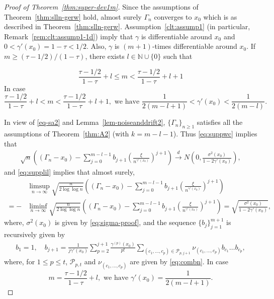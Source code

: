 \documentclass[12pt]{amsart}
\theoremstyle{plain}
\theoremstyle{remark}
\numberwithin{equation}{section}
\begin{document}
\begin{proof}[{Proof of Theorem~\ref{thm:super-dev1m}}] Since the assumptions of Theorem~\ref{thm:slln-gerw} hold, almost surely ${\Gamma}_{n}$ converges to ${x}_0$ which is as described in Theorem~\ref{thm:slln-gerw}. Assumption~\ref{clt:assump1} (in particular, Remark~\ref{rem:clt:assump1-1d}) imply that ${\gamma}$ is differentiable around ${x}_0$ and $0 < {\gamma}'({x}_0) = 1 - \tau < 1/2$. Also, $\gamma$ is $(m+1)$-times differentiable around $x_0$. If $m \geq (\tau-1/2)/(1-\tau)$, there exists $l \in \mathbb{N}\cup\{0\}$ such that 

\[ \frac{\tau-1/2}{1-\tau} + l \leq m < \frac{\tau-1/2}{1-\tau} + l + 1
\] In case 
\[\frac{\tau-1/2}{1-\tau} + l < m < \frac{\tau-1/2}{1-\tau} + l + 1, \text{ we have }  \frac{1}{2(m-l + 1)}< {\gamma}'({x}_0) < \frac{1}{2(m-l)}.\]

In view of \eqref{eq-sa2} and Lemma~\ref{lem-noiseanddrift2}, %
$\{{\Gamma}_n\}_{n \geq 1}$ satisfies all the assumptions of Theorem~\ref{thm:A2} %
(with $k = m-l-1$). Thus \eqref{eq:suppwc} implies that
\begin{align}\label{eq:sdiffclt-pf1}
    \sqrt{n}\left(\left({\Gamma}_{n} - {x}_0\right) - \sum_{j = 0}^{m-l-1} b_{j+1}\left(\frac{{\xi}}{n^{{\gamma}'({x}_0)}}\right)^{j+1}\right) \stackrel{d}{\to} {N}\left(0, \frac{{\sigma}^2(x_0)}{1 - 2{\gamma}'({x}_0)}\right),
\end{align}
and \eqref{eq:supplil} implies that %
almost surely,
\begin{align}\label{eq:sdifflil-pf1}
    &\limsup_{n\to\infty}\sqrt{\frac{n}{2\log \log n}}\left(\left({\Gamma}_{n} - {x}_0\right) - \sum_{j = 0}^{m-l-1} b_{j+1}\left(\frac{{\xi}}{n^{{\gamma}'({x}_0)}}\right)^{j+1}
    \right) \nonumber\\
    =-&\liminf_{n\to\infty}\sqrt{\frac{n}{2\log \log n}}\left(\left({\Gamma}_{n} - {x}_0\right) - \sum_{j = 0}^{m-l-1} b_{j+1}\left(\frac{{\xi}}{n^{{\gamma}'({x}_0)}}\right)^{j+1} \right)
   = \sqrt{\frac{{\sigma}^2(x_0)}{1 - 2{\gamma}'({x}_0)}}, 
\end{align}
where, $\sigma^2(x_0)$ is given by \eqref{eq:sigma-proof}, and %
the sequence $\{b_j\}_{j=1}^{m+1}$ is recursively given by 
\begin{align}\label{eq:coeff}b_1 = 1, \quad b_{j+1} = \frac{1}{j\gamma'(x_0)}\sum_{p=2}^{j+1}\frac{\gamma^{(p)}(x_0)}{p!}\sum_{(c_1, \ldots, c_p) \in \mathcal{P}_{p,j+1}}\nu_{(c_1, \ldots, c_p)}b_{c_1}\ldots b_{c_p},\end{align}
where, for $1 \leq p \leq t$, $\mathcal{P}_{p,t}$ and $\nu_{(c_1, \ldots, c_p)}$ are given by \eqref{eq:combn}.
In case 
\[ m = \frac{\tau-1/2}{1-\tau} + l, \text{ we have } {\gamma}'({x}_0) = \frac{1}{2(m-l+1)}.\] 


\end{proof}
\end{document}
